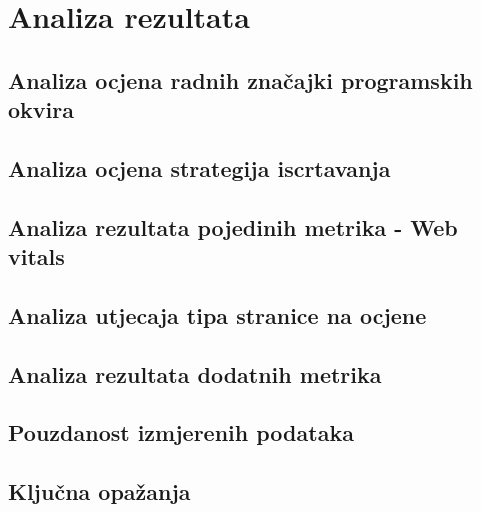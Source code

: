 \section{Analiza rezultata}

\subsection{Analiza ocjena radnih značajki programskih okvira}


\subsection{Analiza ocjena strategija iscrtavanja}

\subsection{Analiza rezultata pojedinih metrika - Web vitals}

\subsection{Analiza utjecaja tipa stranice na ocjene}

\subsection{Analiza rezultata dodatnih metrika}

\subsection{Pouzdanost izmjerenih podataka}

\subsection{Ključna opažanja}
